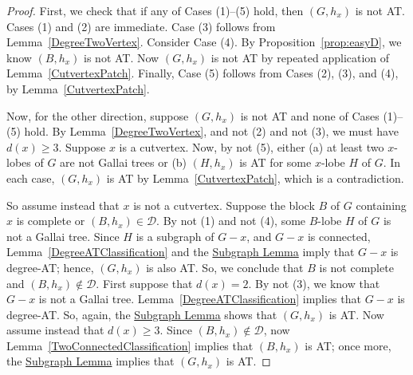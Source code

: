 \documentclass[12pt]{article}
\theoremstyle{plain}
\theoremstyle{definition}
\theoremstyle{remark}
\newcommand{\fancy}[1]{\mathcal{#1}}
\newcommand{\D}{\fancy{D}}
\def\D{\fancy{D}}
\begin{document}
	\begin{proof}
		First, we check that if any of Cases (1)--(5) hold, then $(G, h_x)$ is not AT.  
		Cases (1) and (2) are immediate.  Case (3) follows from
		Lemma~\ref{DegreeTwoVertex}.
		Consider Case (4). 
		By Proposition~\ref{prop:easyD}, we know $(B,h_x)$ is not AT.
		Now $(G,h_x)$ is not AT by repeated application of Lemma~\ref{CutvertexPatch}.
		Finally, Case (5) follows from Cases (2), (3), and (4), by 
		Lemma~\ref{CutvertexPatch}.
		
		Now, for the other direction, suppose $(G, h_x)$ is not AT and none of Cases
		(1)--(5) hold.  By Lemma~\ref{DegreeTwoVertex}, and not (2) and not (3), we
		must have $d(x) \ge 3$. 
		Suppose $x$ is a cutvertex.  Now, by not (5), either (a) at least two $x$-lobes
		of $G$ are not Gallai trees or (b) $(H, h_x)$ is AT for some $x$-lobe $H$ of
		$G$.  In each case, $(G,h_x)$ is AT by Lemma~\ref{CutvertexPatch}, which is a
		contradiction.  
		
		So assume instead that $x$ is not a cutvertex.  Suppose the block $B$ of $G$
		containing $x$ is complete or $(B,h_x) \in \D$.  By not (1) and not (4),
		some $B$-lobe $H$ of $G$ is not a Gallai tree.  Since $H$ is a subgraph of
		$G-x$, and $G-x$ is connected, Lemma~\ref{DegreeATClassification} and the
		\hyperlink{target:InducedSubgraph}{Subgraph Lemma} imply that $G-x$ is degree-AT;
		hence, $(G,h_x)$ is also AT.  So, we conclude that $B$ is not complete and
		$(B,h_x)\notin \D$.
		First suppose that $d(x)=2$.  By not (3), we know that $G-x$ is not a Gallai
		tree.  Lemma~\ref{DegreeATClassification} implies that $G-x$ is degree-AT.
		So, again, the \hyperlink{target:InducedSubgraph}{Subgraph Lemma} shows that $(G,h_x)$
		is AT.  Now assume instead that $d(x)\ge 3$.  Since $(B,h_x)\notin \D$, now
		Lemma~\ref{TwoConnectedClassification} implies that $(B,h_x)$ is AT; 
		once more, the \hyperlink{target:InducedSubgraph}{Subgraph Lemma} implies that $(G,h_x)$
		is AT.
	\end{proof}
	
\end{document}
